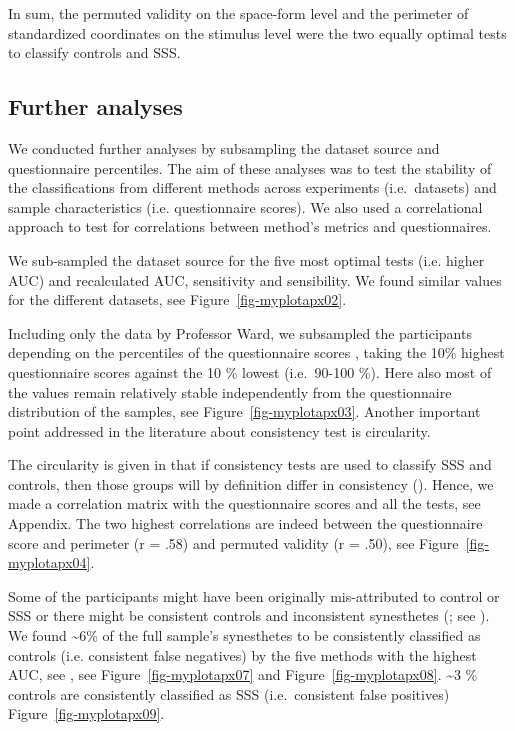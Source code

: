 \documentclass[
  man,
  longtable,
  a4paper,
  nolmodern,
  notxfonts,
  notimes,
  colorlinks=true,linkcolor=blue,citecolor=blue,urlcolor=blue]{apa7}
\begin{document}
In sum, the permuted validity on the space-form level and the perimeter
of standardized coordinates on the stimulus level were the two equally
optimal tests to classify controls and SSS.

\subsection{Further analyses}\label{further-analyses}

We conducted further analyses by subsampling the dataset source and
questionnaire percentiles. The aim of these analyses was to test the
stability of the classifications from different methods across
experiments (i.e.~datasets) and sample characteristics (i.e.
questionnaire scores). We also used a correlational approach to test for
correlations between method's metrics and questionnaires.

We sub-sampled the dataset source for the five most optimal tests (i.e.
higher AUC) and recalculated AUC, sensitivity and sensibility. We found
similar values for the different datasets, see
Figure~\ref{fig-myplotapx02}.

Including only the data by Professor Ward, we subsampled the
participants depending on the percentiles of the questionnaire scores ,
taking the 10\% highest questionnaire scores against the 10 \% lowest
(i.e.~90-100 \%). Here also most of the values remain relatively stable
independently from the questionnaire distribution of the samples, see
Figure~\ref{fig-myplotapx03}. Another important point addressed in the
literature about consistency test is circularity.

The circularity is given in that if consistency tests are used to
classify SSS and controls, then those groups will by definition differ
in consistency (). Hence, we
made a correlation matrix with the questionnaire scores and all the
tests, see Appendix. The two highest correlations are indeed between the
questionnaire score and perimeter (r = .58) and permuted validity (r =
.50), see Figure~\ref{fig-myplotapx04}.

Some of the participants might have been originally mis-attributed to
control or SSS or there might be consistent controls and inconsistent
synesthetes (; see
). We found \textasciitilde6\%
of the full sample's synesthetes to be consistently classified as
controls (i.e. consistent false negatives) by the five methods with the
highest AUC, see , see Figure~\ref{fig-myplotapx07} and
Figure~\ref{fig-myplotapx08}. \textasciitilde3 \% controls are
consistently classified as SSS (i.e.~consistent false positives)
Figure~\ref{fig-myplotapx09}.
\end{document}
